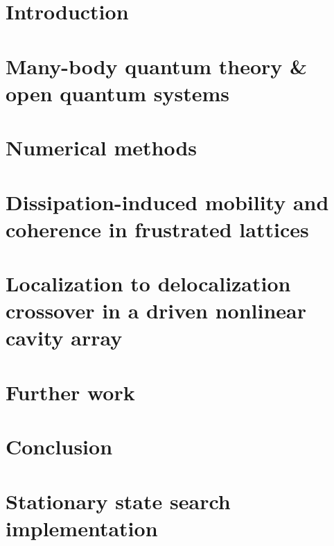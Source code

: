 \documentclass[a4paper,oneside,12pt]{hwthesis}
\newcommand*{\chappath}{../../include/chapters}
\begin{document}


\tableofcontents

\chapter{Introduction}
\setcounter{page}{1}



\chapter[MBQT \& OQS]{\label{chp:MBQOQS}Many-body quantum theory \& open quantum systems}



\chapter{\label{chp:NM}Numerical methods}



\chapter[Frustrated lattices]{\label{chp:DIM}Dissipation-induced mobility and coherence in frustrated lattices}



\chapter[Driven nonlinear cavity array]{\label{chp:DNLCA}Localization to delocalization crossover in a driven nonlinear cavity array}



\chapter{\label{chp:FW}Further work}



\chapter{\label{chp:Conclusion}Conclusion}



\appendix
\chapter{\label{chp:mpostat}Stationary state search implementation}
\end{document}
